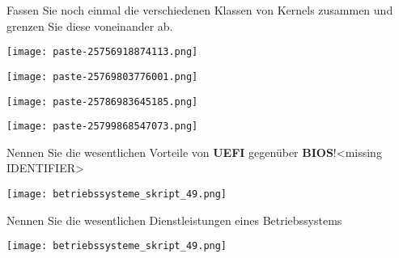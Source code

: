 \documentclass{article}
\begin{document}
\begin{tcolorbox}[colback=white!10!white,colframe=lightgray!75!black,
  savelowerto=\jobname_ex.tex,breakable,enhanced,lines before break=40]

\justifying
Fassen Sie noch einmal die verschiedenen Klassen von Kernels zusammen und grenzen Sie diese voneinander ab.

\tcblower

\justifying
\begin{center}
\texttt{[image: paste-25756918874113.png]}
\end{center}
\begin{center}
\texttt{[image: paste-25769803776001.png]}
\end{center}
\begin{center}
\texttt{[image: paste-25786983645185.png]}
\end{center}
\begin{center}
\texttt{[image: paste-25799868547073.png]}
\end{center}

\end{tcolorbox}
\begin{tcolorbox}[colback=white!10!white,colframe=lightgray!75!black,
  savelowerto=\jobname_ex.tex,breakable,enhanced,lines before break=40]

\justifying
Nennen Sie die wesentlichen Vorteile von \textbf{UEFI} gegenüber \textbf{BIOS}!<missing IDENTIFIER>

\tcblower

\justifying
\begin{center}
\texttt{[image: betriebssysteme\_skript\_49.png]}
\end{center}

\end{tcolorbox}
\begin{tcolorbox}[colback=white!10!white,colframe=lightgray!75!black,
  savelowerto=\jobname_ex.tex,breakable,enhanced,lines before break=40]

\justifying
Nennen Sie die wesentlichen Dienstleistungen eines Betriebssystems

\tcblower

\justifying
\begin{center}
\texttt{[image: betriebssysteme\_skript\_49.png]}
\end{center}

\end{tcolorbox}
\end{document}
